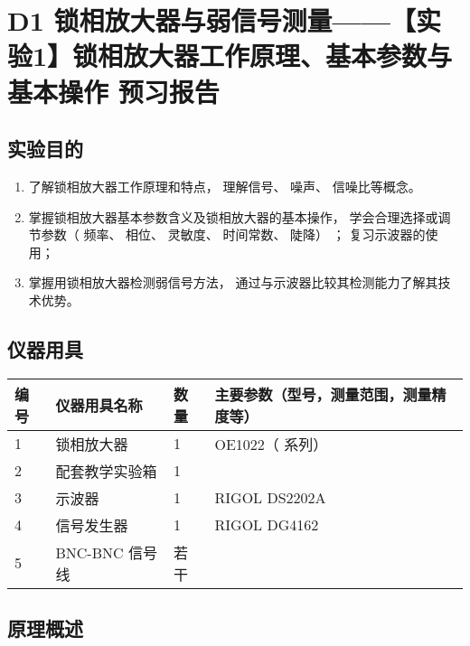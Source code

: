\documentclass[dvipsnames, svgnames,a4paper,11pt]{article}
\begin{document}
\clearpage
\tableofcontents
\clearpage

\setcounter{section}{0}
\section{D1 \quad 锁相放大器与弱信号测量——【实验1】锁相放大器工作原理、基本参数与基本操作 \quad\heiti 预习报告}
	
\subsection{实验目的}
\begin{enumerate}
	\item 了解锁相放大器工作原理和特点， 理解信号、 噪声、 信噪比等概念。
	\item 掌握锁相放大器基本参数含义及锁相放大器的基本操作， 学会合理选择或调节参数（ 频率、 相位、 灵敏度、 时间常数、 陡降） ； 复习示波器的使用；
	\item 掌握用锁相放大器检测弱信号方法， 通过与示波器比较其检测能力了解其技术优势。
	
\end{enumerate}

\subsection{仪器用具}
\begin{table}[htbp]
	\centering
	\renewcommand\arraystretch{1.6}
	\begin{tabular}{p{}|p{}|p{}|p{}}
	\hline
	编号& 仪器用具名称 & 数量 &  主要参数（型号，测量范围，测量精度等） \\
	\hline
	1	&	锁相放大器 	&1 	& OE1022（ 系列）\\

	2	&	配套教学实验箱 	&1 	& 		 \\
	
	3	&	示波器 & 1 &	RIGOL DS2202A 	\\
	
	4	&	信号发生器	&1 & RIGOL DG4162	\\
	
	5	&	BNC-BNC 信号线	&	若干 & \\
	\hline
\end{tabular}
\end{table}

\subsection{原理概述}
\end{document}
